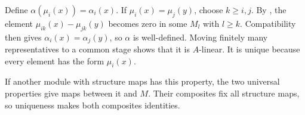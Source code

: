 Define $\alpha(\mu_i(x))=\alpha_i(x)$. If $\mu_i(x)=\mu_j(y)$, choose $k\geq i,j$. By , the element $\mu_{ik}(x)-\mu_{jk}(y)$ becomes zero in some $M_l$ with $l\geq k$. Compatibility then gives $\alpha_i(x)=\alpha_j(y)$, so $\alpha$ is well-defined. Moving finitely many representatives to a common stage shows that it is $A$-linear. It is unique because every element has the form $\mu_i(x)$.

If another module with structure maps has this property, the two universal properties give maps between it and $M$. Their composites fix all structure maps, so uniqueness makes both composites identities.
